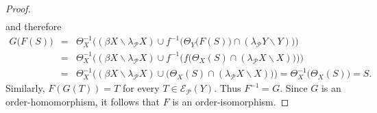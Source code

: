 \documentclass{amsart}
\theoremstyle{definition}
\theoremstyle{remark}
\theoremstyle{notation}
\numberwithin{equation}{section}
\begin{document}
\begin{proof}
\begin{eqnarray*}
\end{eqnarray*}
and therefore
\begin{eqnarray*}
G\big(F(S)\big)&=&\Theta_X^{-1}\big((\beta X\backslash\lambda_{{\mathcal P}} X)\cup f^{-1}\big(\Theta_Y\big(F(S)\big)\cap(\lambda_{{\mathcal P}} Y\backslash Y)\big)\big)\\&=&\Theta_X^{-1}\big((\beta X\backslash\lambda_{{\mathcal P}} X)\cup f^{-1}\big(f\big(\Theta_X(S)\cap(\lambda_{{\mathcal P}} X\backslash X)\big)\big)\big)\\&=&\Theta_X^{-1}\big((\beta X\backslash\lambda_{{\mathcal P}} X)\cup \big(\Theta_X(S)\cap(\lambda_{{\mathcal P}} X\backslash X)\big)\big)=\Theta_X^{-1}\big(\Theta_X(S)\big)=S.
\end{eqnarray*}
Similarly, $F(G(T))=T$ for every  $T\in  {\mathscr E}_{{\mathcal P}}(Y)$. Thus $F^{-1}=G$.   Since $G$  is an  order-homomorphism, it follows that
$F$ is an  order-isomorphism.


\end{proof}
\end{document}

